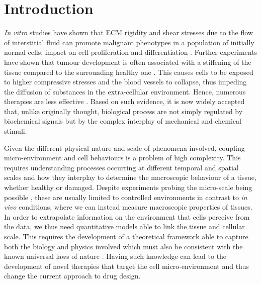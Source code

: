 \section{Introduction}

\textit{In vitro} studies have shown that ECM rigidity and shear stresses due to the flow of interstitial fluid can promote malignant phenotypes in a population of initially normal cells, impact on cell proliferation and differentiation \cite{ex3}. Further experiments have shown that tumour development is often associated with a stiffening of the tissue compared to the surrounding healthy one \cite{ex4}. This causes cells to be exposed to higher compressive stresses and the blood vessels to collapse, thus impeding the diffusion of substances in the extra-cellular environment. Hence, numerous therapies are less effective \cite{ecm2}. Based on such evidence, it is now widely accepted that, unlike originally thought, biological process are not simply regulated by biochemical signals but by the complex interplay of mechanical and chemical stimuli.
 
Given the different physical nature and scale of phenomena involved, coupling micro-environment and cell behaviours is a problem of high complexity. This requires understanding processes occurring at different temporal and spatial scales and how they interplay to determine the macroscopic behaviour of a tissue, whether healthy or damaged. Despite experiments probing the micro-scale being possible \cite{afmtest,viscoporo}, these are usually limited to controlled environments in contrast to \textit{in vivo} conditions, where we can instead measure macroscopic properties of tissues. In order to extrapolate information on the environment that cells perceive from the data, we thus need quantitative models able to link the tissue and cellular scale. This requires the development of a theoretical framework able to capture both the biology and physics involved which must also be consistent with the known universal laws of nature \cite{NET}. Having such knowledge can lead to the development of novel therapies that target the cell micro-environment and thus change the current approach to drug design.  

